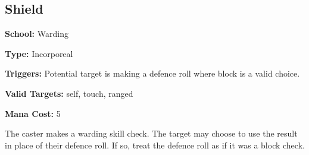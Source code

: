 \subsection*{Shield}

\noindent
\textbf{School:} Warding

\noindent
\textbf{Type:} Incorporeal

\noindent
\textbf{Triggers:} Potential target is making a defence roll where block is a
valid choice.

\noindent
\textbf{Valid Targets:} self, touch, ranged

\noindent
\textbf{Mana Cost:} 5

The caster makes a warding skill check. The target may choose to use the result
in place of their defence roll. If so, treat the defence roll as if it was a
block check.
